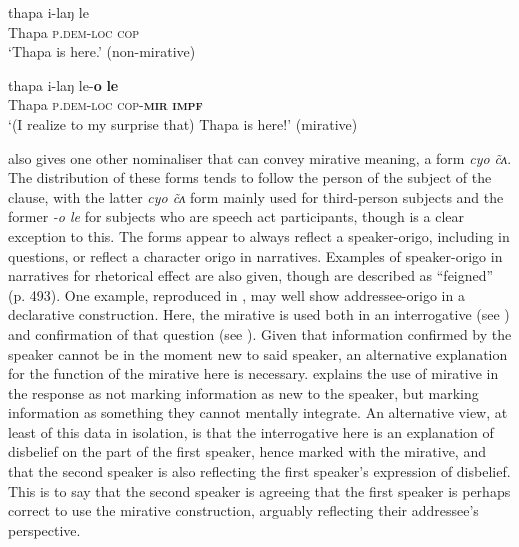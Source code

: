 \begin{exe}
  \ex\label{e:Methods:MagarMirativeIntro}
  \begin{xlist}
    \ex
    \gll thapa i-laŋ le \\
    Thapa \textsc{p.dem-loc} \textsc{cop} \\
    \glt `Thapa is here.' (non-mirative)

    \ex 
    \gll thapa i-laŋ le-\textbf{o} \textbf{le} \\
    Thapa \textsc{p.dem-loc} \textsc{cop-\textbf{mir}} \textsc{\textbf{impf}} \\
    \glt `(I realize to my surprise that) Thapa is here!' (mirative)
  \end{xlist}
  \cite[Magar,][480]{GrunowHarsta2008}
\end{exe}

 also gives one other nominaliser that can convey mirative meaning, a form \textit{cyo \~ cʌ}. The distribution of these forms tends to follow the person of the subject of the clause, with the latter \textit{cyo \~ cʌ} form mainly used for third-person subjects and the former \textit{-o le} for subjects who are speech act participants, though  is a clear exception to this. The forms appear to always reflect a speaker-origo, including in questions, or reflect a character origo in narratives. Examples of speaker-origo in narratives for rhetorical effect are also given, though are described as ``feigned'' (p. 493). One example, reproduced in , may well show addressee-origo in a declarative construction. Here, the mirative is used both in an interrogative (see ) and confirmation of that question (see ). Given that information confirmed by the speaker cannot be in the moment new to said speaker, an alternative explanation for the function of the mirative here is necessary.  explains the use of mirative in the response as not marking information as new to the speaker, but marking information as something they cannot mentally integrate. An alternative view, at least of this data in isolation, is that the interrogative here is an explanation of disbelief on the part of the first speaker, hence marked with the mirative, and that the second speaker is also reflecting the first speaker's expression of disbelief. This is to say that the second speaker is agreeing that the first speaker is perhaps correct to use the mirative construction, arguably reflecting their addressee's perspective.

